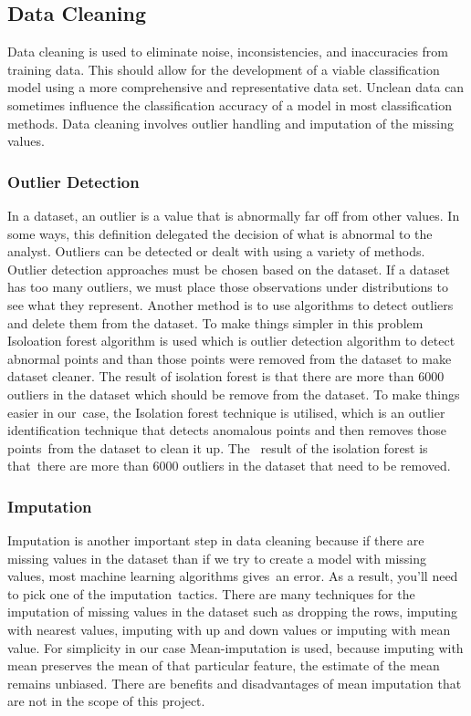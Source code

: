 \documentclass[12pt]{article}
\begin{document}
\subsection{Data Cleaning}
Data cleaning is used to eliminate noise, inconsistencies, and inaccuracies from training data. This should allow for the development of a viable classification model using a more comprehensive and representative data set. Unclean data can sometimes influence the classification accuracy of a model in most classification methods. Data cleaning involves outlier handling and imputation of the missing values.
\subsubsection{Outlier Detection}

In a dataset, an outlier is a value that is abnormally far off from other values. In some ways, this definition delegated the decision of what is abnormal to the analyst. Outliers can be detected or dealt with using a variety of methods. Outlier detection approaches must be chosen based on the dataset. If a dataset has too many outliers, we must place those observations under distributions to see what they represent. Another method is to use algorithms to detect outliers and delete them from the dataset. To make things simpler in this problem Isoloation forest algorithm is used which is outlier detection algorithm to detect abnormal points and than those points were removed from the dataset to make dataset cleaner. The result of isolation forest is that there are more than 6000 outliers in the dataset which should be remove from the dataset. To make things easier in our case, the Isolation forest technique is utilised, which is an outlier identification technique that detects anomalous points and then removes those points from the dataset to clean it up. The  result of the isolation forest is that there are more than 6000 outliers in the dataset that need to be removed.

\subsubsection{Imputation}
Imputation is another important step in data cleaning because if there are missing values in the dataset than if we try to create a model with missing values, most machine learning algorithms gives an error. As a result, you'll need to pick one of the imputation tactics. There are many techniques for the imputation of missing values in the dataset such as dropping the rows, imputing with nearest values, imputing with up and down values or imputing with mean value. For simplicity in our case Mean-imputation is used, because imputing with mean preserves the mean of that particular feature, the estimate of the mean remains unbiased. There are benefits and disadvantages of mean imputation that are not in the scope of this project.
\end{document}
